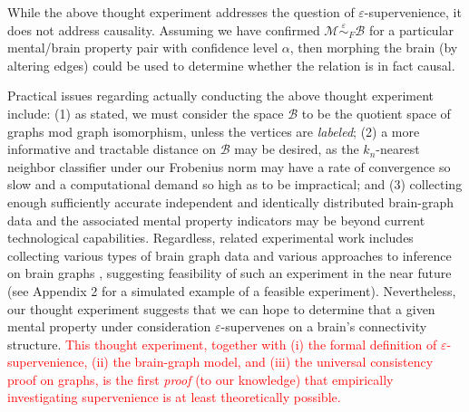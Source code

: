 \documentclass{article}
\newcommand{\mB}{\mathcal{B}}
\newcommand{\mM}{\mathcal{M}}
\newcommand{\MeB}{\mM \overset{\varepsilon}{{\sim}}_F \mB}
\providecommand{\tr}[1]{\textcolor{red}{#1}}
\begin{document}
While the above thought experiment addresses the question of $\varepsilon$-supervenience, it does not address causality. Assuming we have confirmed $\MeB$ for a particular mental/brain property pair with confidence level $\alpha$, then morphing the brain (by altering edges) could be used to determine whether the relation is in fact causal.

Practical issues regarding actually conducting the above thought experiment include: (1) as stated, we must consider the space $\mB$ to be the quotient space of graphs mod graph isomorphism, unless the vertices are {\it labeled}; (2) a more informative and tractable distance on $\mB$ may be desired, as the $k_n$-nearest neighbor classifier under our Frobenius norm may have a rate of convergence so slow and a computational demand so high as to be impractical; and (3) collecting enough sufficiently accurate independent and identically distributed brain-graph data and the associated mental property indicators may be beyond current technological capabilities. Regardless, related experimental work includes collecting various types of brain graph data \cite{WhiteBrenner86, DenkHorstmann04, BriggmanDenk06} and various approaches to inference on brain graphs \cite{MackeBorst08, Mishchenko09, LuLichtman09}, suggesting feasibility of such an experiment in the near future (see Appendix 2 for a simulated example of a feasible experiment). Nevertheless, our thought experiment suggests that we can hope to determine that a given mental property under consideration $\varepsilon$-supervenes on a brain's connectivity structure. \tr{This thought experiment, together with (i) the formal definition of $\varepsilon$-supervenience, (ii) the brain-graph model, and (iii) the universal consistency proof on graphs, is the first \emph{proof} (to our knowledge) that empirically investigating supervenience is at least theoretically possible.}





\end{document}
